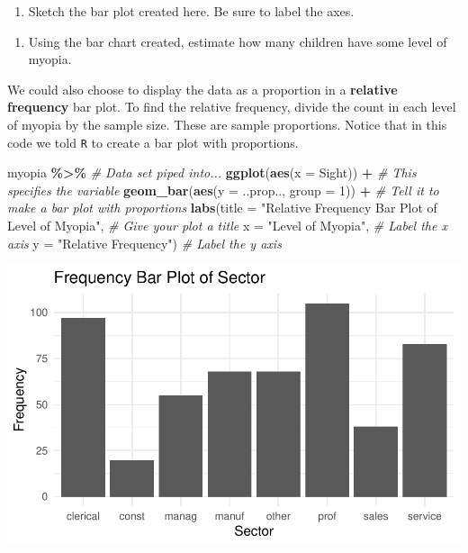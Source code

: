 \documentclass[
]{report}
\newenvironment{Shaded}{\begin{snugshade}}{\end{snugshade}}
\newcommand{\CommentTok}[1]{\textcolor[rgb]{0.56,0.35,0.01}{\textit{#1}}}
\newcommand{\DataTypeTok}[1]{\textcolor[rgb]{0.13,0.29,0.53}{#1}}
\newcommand{\DecValTok}[1]{\textcolor[rgb]{0.00,0.00,0.81}{#1}}
\newcommand{\KeywordTok}[1]{\textcolor[rgb]{0.13,0.29,0.53}{\textbf{#1}}}
\newcommand{\NormalTok}[1]{#1}
\newcommand{\OperatorTok}[1]{\textcolor[rgb]{0.81,0.36,0.00}{\textbf{#1}}}
\newcommand{\StringTok}[1]{\textcolor[rgb]{0.31,0.60,0.02}{#1}}
\providecommand{\tightlist}{%
  \setlength{\itemsep}{0pt}\setlength{\parskip}{0pt}}
\begin{document}
\newpage

\begin{enumerate}
\def\labelenumi{\arabic{enumi}.}
\setcounter{enumi}{1}
\tightlist
\item
  Sketch the bar plot created here. Be sure to label the axes.
\end{enumerate}

\vspace{1.5in}

\begin{enumerate}
\def\labelenumi{\arabic{enumi}.}
\setcounter{enumi}{2}
\tightlist
\item
  Using the bar chart created, estimate how many children have some level of myopia.
\end{enumerate}

\vspace{0.3in}

We could also choose to display the data as a proportion in a \textbf{relative frequency} bar plot. To find the relative frequency, divide the count in each level of myopia by the sample size. These are sample proportions. Notice that in this code we told \texttt{R} to create a bar plot with proportions.

\begin{Shaded}
\begin{Highlighting}[]
\NormalTok{myopia }\OperatorTok{\%\textgreater{}\%}\StringTok{ }\CommentTok{\# Data set piped into...}
\KeywordTok{ggplot}\NormalTok{(}\KeywordTok{aes}\NormalTok{(}\DataTypeTok{x =}\NormalTok{ Sight)) }\OperatorTok{+}\StringTok{   }\CommentTok{\# This specifies the variable}
\StringTok{  }\KeywordTok{geom\_bar}\NormalTok{(}\KeywordTok{aes}\NormalTok{(}\DataTypeTok{y =}\NormalTok{ ..prop.., }\DataTypeTok{group =} \DecValTok{1}\NormalTok{)) }\OperatorTok{+}\StringTok{  }\CommentTok{\# Tell it to make a bar plot with proportions}
\StringTok{  }\KeywordTok{labs}\NormalTok{(}\DataTypeTok{title =} \StringTok{"Relative Frequency Bar Plot of Level of Myopia"}\NormalTok{,  }\CommentTok{\# Give your plot a title}
       \DataTypeTok{x =} \StringTok{"Level of Myopia"}\NormalTok{,   }\CommentTok{\# Label the x axis}
       \DataTypeTok{y =} \StringTok{"Relative Frequency"}\NormalTok{)  }\CommentTok{\# Label the y axis}
\end{Highlighting}
\end{Shaded}

\begin{center}\includegraphics[width=0.5\linewidth]{03-EDA-categorical_files/figure-latex/unnamed-chunk-3-1} \end{center}
\end{document}
